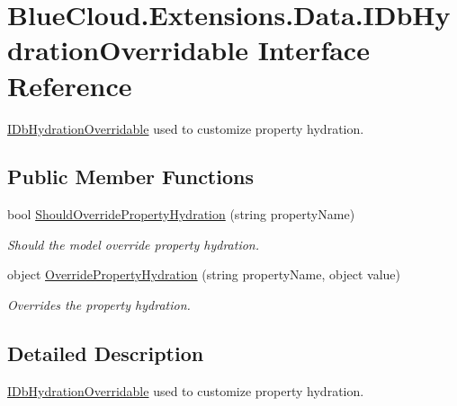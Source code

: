 \hypertarget{interface_blue_cloud_1_1_extensions_1_1_data_1_1_i_db_hydration_overridable}{}\section{Blue\+Cloud.\+Extensions.\+Data.\+I\+Db\+Hydration\+Overridable Interface Reference}
\label{interface_blue_cloud_1_1_extensions_1_1_data_1_1_i_db_hydration_overridable}


\mbox{\hyperlink{interface_blue_cloud_1_1_extensions_1_1_data_1_1_i_db_hydration_overridable}{I\+Db\+Hydration\+Overridable}} used to customize property hydration.  


\subsection*{Public Member Functions}
\begin{DoxyCompactItemize}
\item 
bool \mbox{\hyperlink{interface_blue_cloud_1_1_extensions_1_1_data_1_1_i_db_hydration_overridable_ac384ce77c336d32eba1026cdbeeb818d}{Should\+Override\+Property\+Hydration}} (string property\+Name)
\begin{DoxyCompactList}\small\item\em Should the model override property hydration. \end{DoxyCompactList}\item 
object \mbox{\hyperlink{interface_blue_cloud_1_1_extensions_1_1_data_1_1_i_db_hydration_overridable_aa40bbf2ac59bc19d24ee9d89691931ec}{Override\+Property\+Hydration}} (string property\+Name, object value)
\begin{DoxyCompactList}\small\item\em Overrides the property hydration. \end{DoxyCompactList}\end{DoxyCompactItemize}


\subsection{Detailed Description}
\mbox{\hyperlink{interface_blue_cloud_1_1_extensions_1_1_data_1_1_i_db_hydration_overridable}{I\+Db\+Hydration\+Overridable}} used to customize property hydration. 



